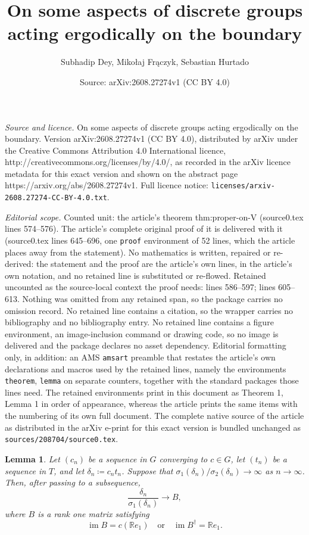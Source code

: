 \documentclass[10pt,a4paper]{amsart}
\title{On some aspects of discrete groups acting ergodically on the boundary}
\author{Subhadip Dey, Mikołaj Frączyk, Sebastian Hurtado}
\date{Source: arXiv:2608.27274v1 (CC BY 4.0)}
\newtheorem{lemma}{Lemma}
\begin{document}
\maketitle

\noindent\emph{Source and licence.} On some aspects of discrete groups acting ergodically on the boundary. Version arXiv:2608.27274v1 (CC BY 4.0), distributed by arXiv under the Creative Commons Attribution 4.0 International licence, http://creativecommons.org/licenses/by/4.0/, as recorded in the arXiv licence metadata for this exact version and shown on the abstract page https://arxiv.org/abs/2608.27274v1. Full licence notice: \texttt{licenses/arxiv-2608.27274-CC-BY-4.0.txt}.\par\smallskip

\noindent\textit{Editorial scope.} Counted unit: the article's theorem thm:proper-on-V (source0.tex lines 574--576). The article's complete original proof of it is delivered with it (source0.tex lines 645--696, one \texttt{proof} environment of 52 lines, which the article places away from the statement). No mathematics is written, repaired or re-derived: the statement and the proof are the article's own lines, in the article's own notation, and no retained line is substituted or re-flowed.  Retained uncounted as the source-local context the proof needs: lines 586--597; lines 605--613.  Nothing was omitted from any retained span, so the package carries no omission record.  No retained line contains a citation, so the wrapper carries no bibliography and no bibliography entry.  No retained line contains a figure environment, an image-inclusion command or drawing code, so no image is delivered and the package declares no asset dependency.  Editorial formatting only, in addition: an AMS \texttt{amsart} preamble that restates the article's own declarations and macros used by the retained lines, namely the environments \texttt{theorem}, \texttt{lemma} on separate counters, together with the standard packages those lines need.  The retained environments print in this document as Theorem 1, Lemma 1 in order of appearance, whereas the article prints the same items with the numbering of its own full document.  The complete native source of the article as distributed in the arXiv e-print for this exact version is bundled unchanged as \texttt{sources/208704/source0.tex}.
\begin{lemma}\label{lem:T}
    Let $(c_n)$ be a sequence in $G$ converging to $c\in G$, let $(t_n)$ be a sequence in $T$, and let $\delta_n \coloneqq c_n t_n$. Suppose that $\sigma_1(\delta_n)/\sigma_2(\delta_n) \to\infty$ as $n \to\infty$. Then, after passing to a subsequence,
    \[
     \frac{\delta_n}{\sigma_1(\delta_n)} \to B,
    \]
    where $B$ is a rank one matrix satisfying
    \[
     \operatorname{im} B = c(\mathbb R e_1)
     \quad \text{or} \quad
     \operatorname{im} B^\dagger = \mathbb R e_1.
    \]
\end{lemma}
\end{document}
